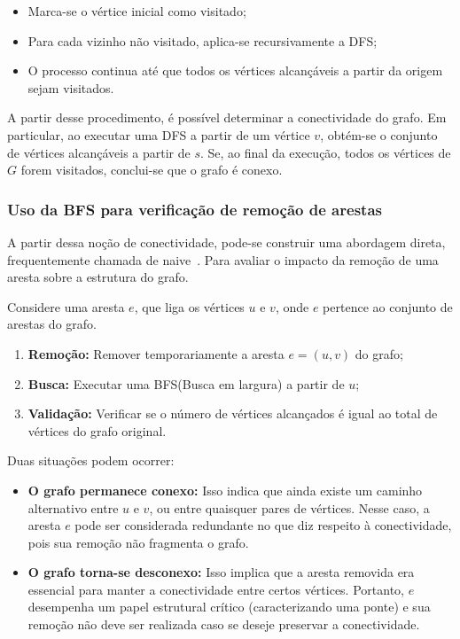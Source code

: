 \documentclass{sbc2023}%
\begin{document}
    \begin{itemize}
        \item Marca-se o vértice inicial como visitado;
        \item Para cada vizinho não visitado, aplica-se recursivamente a DFS;
        \item O processo continua até que todos os vértices alcançáveis a partir da origem sejam visitados.
    \end{itemize}

A partir desse procedimento, é possível determinar a conectividade do grafo. Em particular, ao executar uma DFS a partir de um vértice $v$, obtém-se o conjunto de vértices alcançáveis a partir de $s$. Se, ao final da execução, todos os vértices de $G$ forem visitados, conclui-se que o grafo é conexo.

\subsubsection{Uso da BFS para verificação de remoção de arestas}

A partir dessa noção de conectividade, pode-se construir uma abordagem direta, frequentemente chamada de naive~\citep{cormen2022Naive}. Para avaliar o impacto da remoção de uma aresta sobre a estrutura do grafo.

Considere uma aresta $e$, que liga os vértices $u$ e $v$, onde $e$ pertence ao conjunto de arestas do grafo.

\begin{enumerate}
    \item \textbf{Remoção:} Remover temporariamente a aresta $e = (u, v)$ do grafo;
    \item \textbf{Busca:} Executar uma BFS(Busca em largura) a partir de $u$;
    \item \textbf{Validação:} Verificar se o número de vértices alcançados é igual ao total de vértices do grafo original.
\end{enumerate}

Duas situações podem ocorrer:

\begin{itemize}
    \item \textbf{O grafo permanece conexo:} 
    Isso indica que ainda existe um caminho alternativo entre $u$ e $v$, ou entre quaisquer pares de vértices. Nesse caso, a aresta $e$ pode ser considerada redundante no que diz respeito à conectividade, pois sua remoção não fragmenta o grafo.
    
    \item \textbf{O grafo torna-se desconexo:} 
    Isso implica que a aresta removida era essencial para manter a conectividade entre certos vértices. Portanto, $e$ desempenha um papel estrutural crítico (caracterizando uma ponte) e sua remoção não deve ser realizada caso se deseje preservar a conectividade.
\end{itemize}
\end{document}
